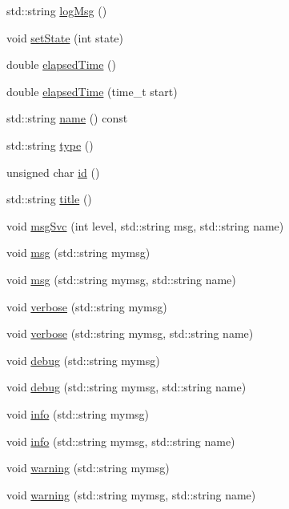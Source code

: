 \begin{DoxyCompactItemize}
\item 
std::string \hyperlink{classProcessus_a42fdeb17dc13ba854222666b6aa29b61}{logMsg} ()
\item 
void \hyperlink{classProcessus_ad38cde0f1bcefa00b068e7947b8af927}{setState} (int state)
\item 
double \hyperlink{classProcessus_aecca96218c65bc805c988cd95447df55}{elapsedTime} ()
\item 
double \hyperlink{classProcessus_a06d3815ad56593dfd0d3c1f534f8b146}{elapsedTime} (time\_\-t start)
\item 
std::string \hyperlink{classObject_a975e888d50bfcbffda2c86368332a5cd}{name} () const 
\item 
std::string \hyperlink{classObject_a84f99f70f144a83e1582d1d0f84e4e62}{type} ()
\item 
unsigned char \hyperlink{classObject_af99145335cc61ff6e2798ea17db009d2}{id} ()
\item 
std::string \hyperlink{classObject_a73a0f1a41828fdd8303dd662446fb6c3}{title} ()
\item 
void \hyperlink{classObject_a3f9d5537ebce0c0f2bf6ae4d92426f3c}{msgSvc} (int level, std::string msg, std::string name)
\item 
void \hyperlink{classObject_a58b2d0618c2d08cf2383012611528d97}{msg} (std::string mymsg)
\item 
void \hyperlink{classObject_ac5d59299273cee27aacf7de00d2e7034}{msg} (std::string mymsg, std::string name)
\item 
void \hyperlink{classObject_a83d2db2df682907ea1115ad721c1c4a1}{verbose} (std::string mymsg)
\item 
void \hyperlink{classObject_a2d4120195317e2a3c6532e8bb9f3da68}{verbose} (std::string mymsg, std::string name)
\item 
void \hyperlink{classObject_aac010553f022165573714b7014a15f0d}{debug} (std::string mymsg)
\item 
void \hyperlink{classObject_a6c9a0397ca804e04d675ed05683f5420}{debug} (std::string mymsg, std::string name)
\item 
void \hyperlink{classObject_a644fd329ea4cb85f54fa6846484b84a8}{info} (std::string mymsg)
\item 
void \hyperlink{classObject_a1ca123253dfd30fc28b156f521dcbdae}{info} (std::string mymsg, std::string name)
\item 
void \hyperlink{classObject_a65cd4fda577711660821fd2cd5a3b4c9}{warning} (std::string mymsg)
\item 
void \hyperlink{classObject_a11f101db4dd73d9391b0231818881d86}{warning} (std::string mymsg, std::string name)

\end{DoxyCompactItemize}
